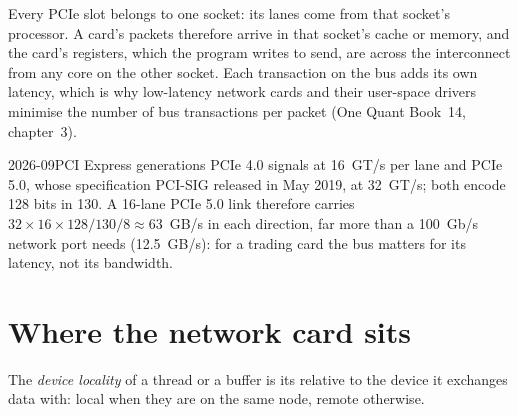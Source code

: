 Every PCIe slot belongs to one socket: its lanes come from that socket's processor. A card's packets therefore arrive in
that socket's cache or memory, and the card's registers, which the program writes to send, are across the interconnect
from any core on the other socket. Each transaction on the bus adds its own latency, which is why low-latency network cards and their user-space drivers
minimise the number of bus transactions per packet (One Quant Book~14, chapter~3).

\begin{dated}{2026-09}{PCI Express generations}\label{dat:ll:multi-socket-machines-and-interconnects:pcie}
PCIe 4.0 signals at 16~GT/s per lane and PCIe 5.0, whose specification PCI-SIG released in May 2019, at 32~GT/s; both
encode 128 bits in 130. A 16-lane PCIe 5.0 link therefore carries $32 \times 16 \times 128/130/8 \approx 63$~GB/s in each
direction, far more than a 100~Gb/s network port needs (12.5~GB/s): for a trading card the bus matters for its latency,
not its bandwidth.
\end{dated}

\section{Where the network card sits}

\begin{definition}\label{def:ll:multi-socket-machines-and-interconnects:locality}
The \emph{device locality} of a thread or a buffer is its  relative to the device it
exchanges data with: local when they are on the same node, remote otherwise.
\end{definition}

